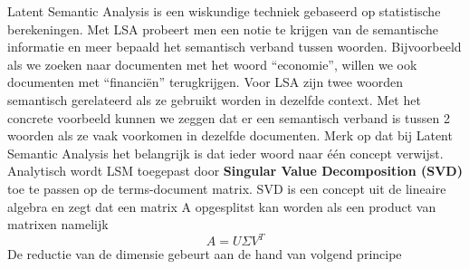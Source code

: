 Latent Semantic Analysis is een wiskundige techniek gebaseerd op statistische berekeningen. Met LSA probeert men een notie te krijgen van de semantische informatie en meer bepaald het semantisch verband tussen woorden. Bijvoorbeeld als we zoeken naar documenten met het woord ``economie'', willen we ook documenten met ``financi\"en'' terugkrijgen. Voor LSA zijn twee woorden semantisch gerelateerd als ze gebruikt worden in dezelfde context. Met het concrete voorbeeld kunnen we zeggen dat er een semantisch verband is tussen 2 woorden als ze vaak voorkomen in dezelfde documenten.
\newline
Merk op dat bij Latent Semantic Analysis het belangrijk is dat ieder woord naar \'e\'en concept verwijst.
%
\newline
Analytisch wordt LSM toegepast door \textbf{Singular Value Decomposition (SVD)} toe te passen op de terms-document matrix. SVD is een concept uit de lineaire algebra en zegt dat een matrix A opgesplitst kan worden als een product van matrixen namelijk \\
\[A = U\Sigma V^T \]
De reductie van de dimensie gebeurt aan de hand van volgend principe
%
\newcommand{\vect}{\mathbf}
\newcommand{\nul}{\operatorname{Nul}}
\newcommand{\col}{\operatorname{Kolommen }}
\newcommand{\row}{\operatorname{Rijen}}
